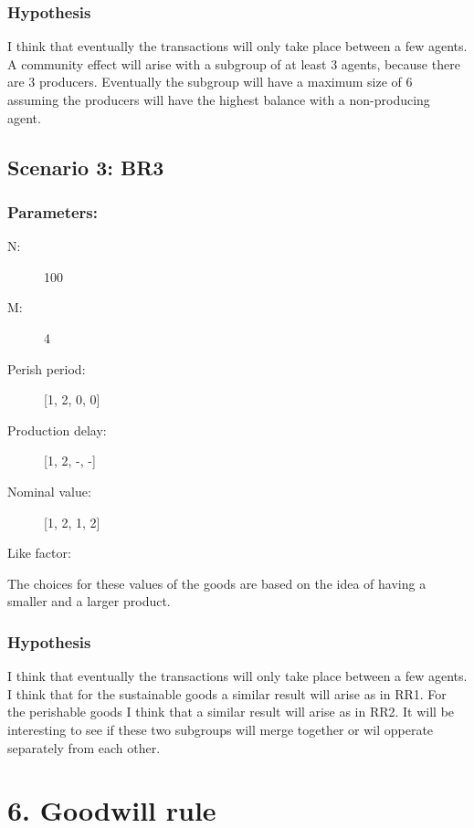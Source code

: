 \documentclass{article}
\begin{document}
\subsubsection{Hypothesis}
I think that eventually the transactions will only take place between a few agents. A community effect will arise with a subgroup of at least 3 agents, because there are 3 producers. Eventually the subgroup will have a maximum size of 6 assuming the producers will have the highest balance with a non-producing agent.

\subsection{Scenario 3: BR3}
\subsubsection{Parameters:}
\begin{description}
  \item[N:] 100
  \item[M:] 4
  \item[Perish period:] [1, 2, 0, 0]
  \item[Production delay:] [1, 2, -, -]
  \item[Nominal value:] [1, 2, 1, 2]
  \item[Like factor:] 
\end{description}

The choices for these values of the goods are based on the idea of having a smaller and a larger product.

\subsubsection{Hypothesis}
I think that eventually the transactions will only take place between a few agents. I think that for the sustainable goods a similar result will arise as in RR1. For the perishable goods I think that a similar result will arise as in RR2. It will be interesting to see if these two subgroups will merge together or wil opperate separately from each other.

\section{6. Goodwill rule}
\end{document}

